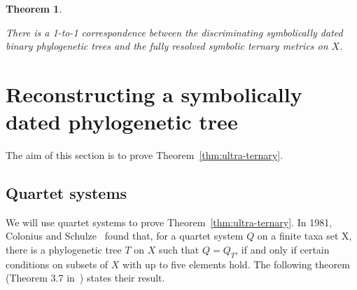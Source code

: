 \documentclass{article}
\newtheorem{theorem}{Theorem}
\begin{document}
\begin{theorem} \label{thm:binary}

There is a 1-to-1 correspondence between the discriminating symbolically 
dated binary phylogenetic trees and the 
fully resolved symbolic ternary metrics on $X$.  





\end{theorem}

% 
% 
% 
% 
% 
% 
% 
% 



\section{Reconstructing a symbolically dated phylogenetic tree}
\label{sect:proof}

The aim of this section is to prove Theorem~\ref{thm:ultra-ternary}.

\subsection{Quartet systems}
\label{subsect:quartet}

We will use quartet systems to prove Theorem~\ref{thm:ultra-ternary}. 
In 1981, Colonius and Schulze~\cite{Colonius1981} found that, 
for a quartet system $Q$ on 
a finite taxa set X, there is a phylogenetic tree $T$ on $X$ such that 
$Q=Q_T$, if and only if certain conditions on subsets of $X$ with up to 
five elements hold. The following theorem (Theorem 3.7 in~\cite{Dress2012}) 
states their result. 


%
\end{document}
